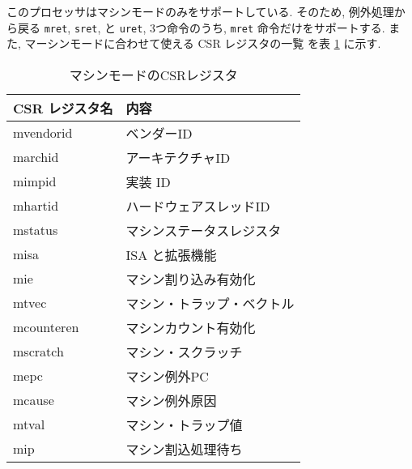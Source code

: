\documentclass[../specifications.tex]{subfiles}
\begin{document}
  このプロセッサはマシンモードのみをサポートしている.
  そのため, 例外処理から戻る \verb|mret|, \verb|sret|, と \verb|uret|, 
  3つ命令のうち, \verb|mret| 命令だけをサポートする.
  また, マーシンモードに合わせて使える CSR レジスタの一覧
  \cite{riscv-reader} \cite{riscv-priviledged}
  を表 \ref{table:csrs} に示す.

  \begin{table}[h]
    \begin{tabular}{|l|l|}
    \hline
    CSR レジスタ名 & 内容 \\ \hline
    mvendorid & ベンダーID \\
    marchid & アーキテクチャID \\
    mimpid & 実装 ID \\
    mhartid & ハードウェアスレッドID \\
    mstatus & マシンステータスレジスタ \\
    misa & ISA と拡張機能 \\
    mie & マシン割り込み有効化 \\
    mtvec & マシン・トラップ・ベクトル \\
    mcounteren & マシンカウント有効化 \\
    mscratch & マシン・スクラッチ \\
    mepc & マシン例外PC \\
    mcause & マシン例外原因 \\
    mtval & マシン・トラップ値 \\
    mip & マシン割込処理待ち \\ \hline
    \end{tabular}
    \caption{マシンモードのCSRレジスタ}
    \label{table:csrs}
  \end{table}
  
\end{document}
